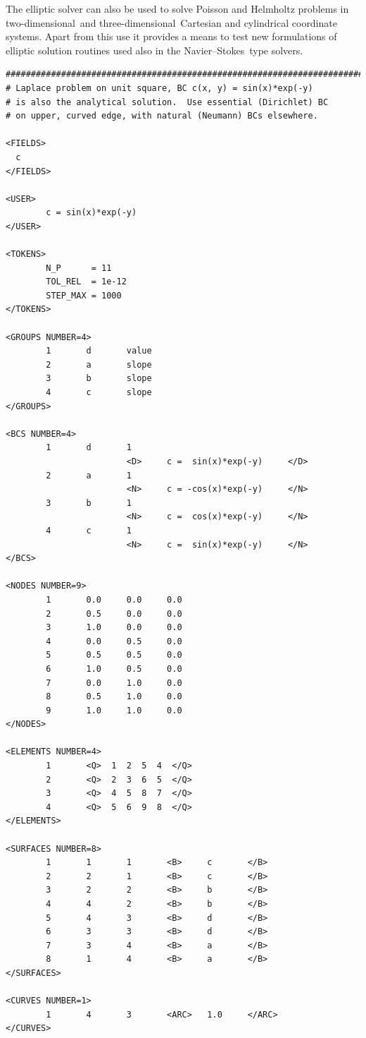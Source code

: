 \documentclass[11pt]{report}
\newcommand\twod{two-di\-men\-sion\-al}
\newcommand\threed{three-di\-men\-sion\-al}
\newcommand\NavSto{Navier--Stokes}
\begin{document}
The elliptic solver can also be used to solve Poisson and Helmholtz
problems in \twod\ and \threed\ Cartesian and cylindrical coordinate
systems.  Apart from this use it provides a means to test new
formulations of elliptic solution routines used also in the
\NavSto\ type solvers.

{\small
\begin{verbatim}
##############################################################################
# Laplace problem on unit square, BC c(x, y) = sin(x)*exp(-y)
# is also the analytical solution.  Use essential (Dirichlet) BC
# on upper, curved edge, with natural (Neumann) BCs elsewhere.

<FIELDS>
  c
</FIELDS>

<USER>
        c = sin(x)*exp(-y)
</USER>

<TOKENS>
        N_P      = 11
        TOL_REL  = 1e-12
        STEP_MAX = 1000
</TOKENS>

<GROUPS NUMBER=4>
        1       d       value
        2       a       slope
        3       b       slope
        4       c       slope
</GROUPS>

<BCS NUMBER=4>
        1       d       1
                        <D>     c =  sin(x)*exp(-y)     </D>
        2       a       1
                        <N>     c = -cos(x)*exp(-y)     </N>
        3       b       1
                        <N>     c =  cos(x)*exp(-y)     </N>
        4       c       1
                        <N>     c =  sin(x)*exp(-y)     </N>
</BCS>

<NODES NUMBER=9>
        1       0.0     0.0     0.0
        2       0.5     0.0     0.0
        3       1.0     0.0     0.0
        4       0.0     0.5     0.0
        5       0.5     0.5     0.0
        6       1.0     0.5     0.0
        7       0.0     1.0     0.0
        8       0.5     1.0     0.0
        9       1.0     1.0     0.0
</NODES>

<ELEMENTS NUMBER=4>
        1       <Q>  1  2  5  4  </Q>
        2       <Q>  2  3  6  5  </Q>
        3       <Q>  4  5  8  7  </Q>
        4       <Q>  5  6  9  8  </Q>
</ELEMENTS>

<SURFACES NUMBER=8>
        1       1       1       <B>     c       </B>
        2       2       1       <B>     c       </B>
        3       2       2       <B>     b       </B>
        4       4       2       <B>     b       </B>
        5       4       3       <B>     d       </B>
        6       3       3       <B>     d       </B>
        7       3       4       <B>     a       </B>
        8       1       4       <B>     a       </B>
</SURFACES>

<CURVES NUMBER=1>
        1       4       3       <ARC>   1.0     </ARC>
</CURVES>
\end{verbatim}
}
\end{document}
